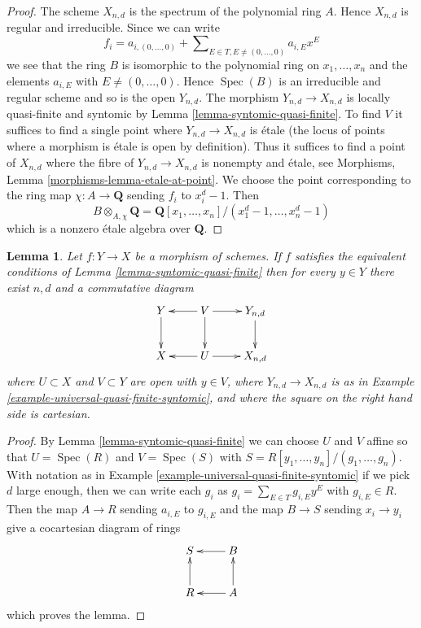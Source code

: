 \documentclass[10pt,a4paper]{amsart}
\theoremstyle{plain}
\newtheorem{lemma}[subsection]{Lemma}
\theoremstyle{definition}
\theoremstyle{remark}
\numberwithin{equation}{subsection}
\def\Spec{\mathop{\mathrm{Spec}}}
\begin{document}
\begin{proof}
The scheme $X_{n, d}$ is the spectrum of the polynomial ring $A$.
Hence $X_{n, d}$ is regular and irreducible. Since we can write
$$
f_i = a_{i, (0, \ldots, 0)} +
\sum\nolimits_{E \in T, E \not = (0, \ldots, 0)} a_{i, E} x^E
$$
we see that the ring $B$ is isomorphic to the polynomial ring
on $x_1, \ldots, x_n$ and the elements $a_{i, E}$ with
$E \not = (0, \ldots, 0)$. Hence $\Spec(B)$ is an irreducible and
regular scheme and so is the open $Y_{n, d}$. The morphism
$Y_{n, d} \to X_{n, d}$ is locally quasi-finite and syntomic by
Lemma \ref{lemma-syntomic-quasi-finite}. To find $V$ it suffices
to find a single point where $Y_{n, d} \to X_{n, d}$ is \'etale
(the locus of points where a morphism is \'etale is open by
definition). Thus it suffices to find a point of $X_{n, d}$
where the fibre of $Y_{n, d} \to X_{n, d}$ is nonempty and \'etale, see
Morphisms, Lemma \ref{morphisms-lemma-etale-at-point}. We choose
the point corresponding to the ring map $\chi : A \to \mathbf{Q}$
sending $f_i$ to $x_i^d - 1$. Then
$$
B \otimes_{A, \chi} \mathbf{Q} =
\mathbf{Q}[x_1, \ldots, x_n]/(x_1^d - 1, \ldots, x_n^d - 1)
$$
which is a nonzero \'etale algebra over $\mathbf{Q}$.
\end{proof}

\begin{lemma}
\label{lemma-locally-comes-from-universal}
Let $f : Y \to X$ be a morphism of schemes. If $f$ satisfies the equivalent
conditions of Lemma \ref{lemma-syntomic-quasi-finite} then for every
$y \in Y$ there exist $n, d$ and a commutative diagram
$$
\xymatrix{
Y \ar[d] &
V \ar[d] \ar[l] \ar[r] &
Y_{n, d} \ar[d] \\
X & U \ar[l] \ar[r] &
X_{n, d}
}
$$
where $U \subset X$ and $V \subset Y$ are open with $y \in V$,
where $Y_{n, d} \to X_{n, d}$
is as in Example \ref{example-universal-quasi-finite-syntomic}, and
where the square on the right hand side is cartesian.
\end{lemma}

\begin{proof}
By Lemma \ref{lemma-syntomic-quasi-finite}
we can choose $U$ and $V$ affine so that
$U = \Spec(R)$ and $V = \Spec(S)$ with
$S = R[y_1, \ldots, y_n]/(g_1, \ldots, g_n)$.
With notation as in Example \ref{example-universal-quasi-finite-syntomic}
if we pick $d$ large enough, then we can write each $g_i$ as
$g_i = \sum_{E \in T} g_{i, E}y^E$ with $g_{i, E} \in R$.
Then the map $A \to R$ sending $a_{i, E}$ to $g_{i, E}$
and the map $B \to S$ sending $x_i \to y_i$ give a cocartesian
diagram of rings
$$
\xymatrix{
S & B \ar[l] \\
R \ar[u] & A \ar[l] \ar[u]
}
$$
which proves the lemma.
\end{proof}



\end{document}
